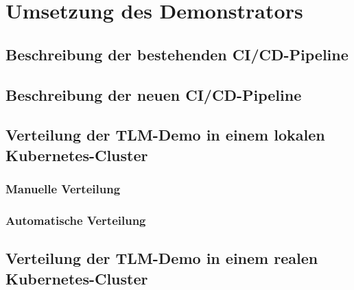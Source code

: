 \chapter{Umsetzung des Demonstrators}

\section{Beschreibung der bestehenden CI/CD-Pipeline}

\section{Beschreibung der neuen CI/CD-Pipeline}

\section{Verteilung der TLM-Demo in einem lokalen Kubernetes-Cluster}

\subsection{Manuelle Verteilung}

\subsection{Automatische Verteilung}

\section{Verteilung der TLM-Demo in einem realen Kubernetes-Cluster}